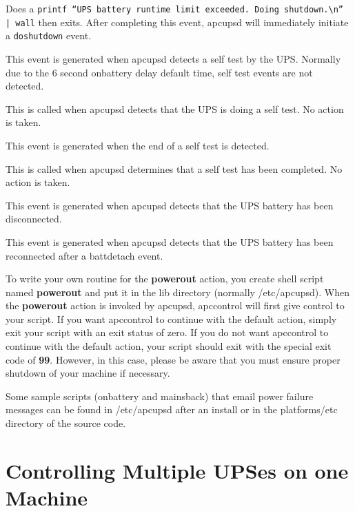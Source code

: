 {{{{{{\begin{description}
Does a {\tt printf ``UPS battery runtime limit exceeded. Doing
shutdown.\textbackslash{}n'' | wall} then exits. After completing this event,
apcupsd will immediately initiate a {\tt doshutdown} event.  

\item [startselftest]
   This event is generated when apcupsd detects a self test by the UPS. Normally
due to the 6 second onbattery delay default time, self test events are not
detected.  

This is called when apcupsd detects that the UPS is doing a self test. No
action is taken.  

\item [endselftest]
   This event is generated when the end of a self test is detected.  

This is called when apcupsd determines that a self test has been completed. No
action is taken.  

\item [battdetach]
   This event is generated when apcupsd detects that the UPS battery has been
disconnected.

\item [battattach]
   This event is generated when apcupsd detects that the UPS battery has been
reconnected after a battdetach event.  
\end{description}

To write your own routine for the {\bf powerout} action, you create shell
script named {\bf powerout} and put it in the lib directory (normally
/etc/apcupsd).  When the {\bf powerout} action is invoked by apcupsd,
apccontrol will first give control to your script.  If you want apccontrol to
continue with the default action, simply exit your script with an exit status
of zero.  If you do not want apccontrol to continue with the default action,
your script should exit with the special exit code of {\bf 99}.  However, in
this case, please be aware that you must ensure proper shutdown of your
machine if necessary.  

Some sample scripts (onbattery and mainsback) that email power failure
messages can be found in /etc/apcupsd after an install or in the
platforms/etc directory of the source code.


\label{Controlling-Multiple-UPSes-on-one-Machine}

\section*{Controlling Multiple UPSes on one Machine}

}}}}}}
